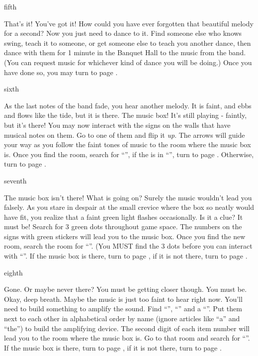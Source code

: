\documentclass[greennotebook]{NeptuneBall}
\begin{document}
\begin{page}{fifth}

That's it! You've got it! How could you have ever forgotten that beautiful melody for a second? Now you just need to dance to it. Find someone else who knows swing, teach it to someone, or get someone else to teach you another dance, then dance with them for 1 minute in the Banquet Hall to the music from the band. (You can request music for whichever kind of dance you will be doing.) Once you have done so, you may turn to page .

\end{page}

\begin{page}{sixth}

As the last notes of the band fade, you hear another melody. It is faint, and ebbs and flows like the tide, but it is there. The music box! It's still playing - faintly, but it's there! You may now interact with the signs on the walls that have musical notes on them. Go to one of them and flip it \emph{up}. The arrows will guide your way as you follow the faint tones of music to the room where the music box is. Once you find the room, search for ``\sPacketA{}'', if the \iMusicBox{} is in ``\sPacketA{}'', turn to page . Otherwise, turn to page .

\end{page}

\begin{page}{seventh}

The music box isn't there! What is going on? Surely the music wouldn't lead you falsely. As you stare in despair at the small crevice where the box so neatly would have fit, you realize that a faint green light flashes occasionally. Is it a clue? It must be!  Search for 3 green dots throughout game space. The numbers on the signs with green stickers will lead you to the music box. Once you find the new room, search the room for ``\sPacketB{}''. (You MUST find the 3 dots before you can interact with ``\sPacketB{}''. If the music box is there, turn to page , if it is not there, turn to page .

\end{page}

\begin{page}{eighth}

Gone. Or maybe never there? You must be getting closer though. You must be. Okay, deep breath. Maybe the music is just too faint to hear right now. You'll need to build something to amplify the sound. Find ``\iConch{\MYname}'', ``\iPaper{\MYname}'' and a ``\iClam{\MYname}''. Put them next to each other in alphabetical order by name (ignore articles like ``a'' and ``the'') to build the amplifying device. The second digit of each item number will lead you to the room where the music box is. Go to that room and search for ``\sPacketC{}''. If the music box is there, turn to page , if it is not there, turn to page .

\end{page}
\end{document}
